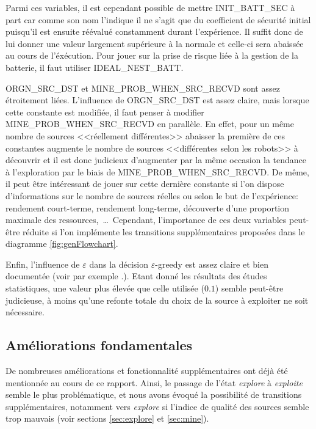 Parmi ces variables, il est cependant possible de mettre {\ttfamily INIT\_BATT\_SEC} à part car comme son nom l'indique il ne s'agit que du coefficient de sécurité initial puisqu'il est ensuite réévalué constamment durant l'expérience. Il suffit donc de lui donner une valeur largement supérieure à la normale et celle-ci sera abaissée au cours de l'éxécution. Pour jouer sur la prise de risque liée à la gestion de la batterie, il faut utiliser {\ttfamily IDEAL\_NEST\_BATT}.

{\ttfamily ORGN\_SRC\_DST} et {\ttfamily MINE\_PROB\_WHEN\_SRC\_RECVD} sont assez étroitement liées. L'influence de {\ttfamily ORGN\_SRC\_DST} est assez claire, mais lorsque cette constante est modifiée, il faut penser à modifier {\ttfamily MINE\_PROB\_WHEN\_SRC\_RECVD} en parallèle. En effet, pour un même nombre de sources <<réellement différentes>> abaisser la première de ces constantes augmente le nombre de sources <<différentes selon les robots>> à découvrir et il est donc judicieux d'augmenter par la même occasion la tendance à l'exploration par le biais de {\ttfamily MINE\_PROB\_WHEN\_SRC\_RECVD}. De même, il peut être intéressant de jouer sur cette dernière constante si l'on dispose d'informations sur le nombre de sources réelles ou selon le but de l'expérience: rendement court-terme, rendement long-terme, découverte d'une proportion maximale des ressources,~\ldots\ Cependant, l'importance de ces deux variables peut-être réduite si l'on implémente les transitions supplémentaires proposées dans le diagramme \ref{fig:genFlowchart}.

Enfin, l'influence de $\varepsilon$ dans la décision $\varepsilon$-greedy est assez claire et bien documentée (voir par exemple \cite{foraging}.). Etant donné les résultats des études statistiques, une valeur plus élevée que celle utilisée ($0.1$) semble peut-être judicieuse, à moins qu'une refonte totale du choix de la source à exploiter ne soit nécessaire.

\subsection{Améliorations fondamentales}

De nombreuses améliorations et fonctionnalité supplémentaires ont déjà été mentionnée au cours de ce rapport. Ainsi, le passage de l'état \emph{explore} à \emph{exploite} semble le plus problématique, et nous avons évoqué la possibilité de transitions supplémentaires, notamment vers \emph{explore} si l'indice de qualité des sources semble trop mauvais (voir sections \ref{sec:explore} et \ref{sec:mine}).

